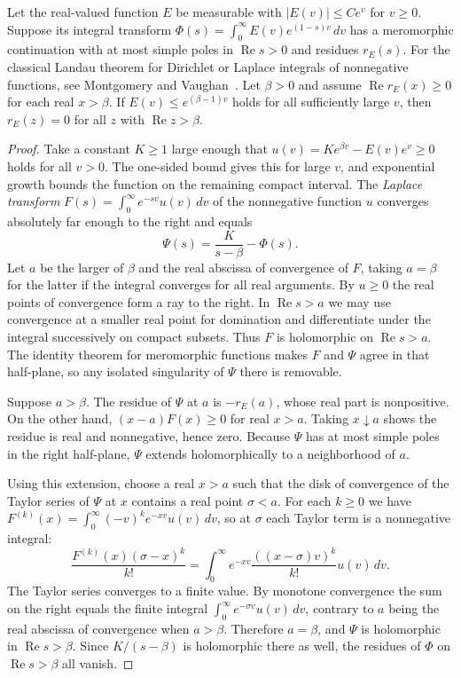 \begin{lemma}
\label{lem:landau}
\emitthmsource
Let the real-valued function $E$ be measurable with $|E(v)|\le C e^v$ for $v\ge0$. Suppose its integral transform $\Phi(s)=\int_0^\infty E(v)e^{(1-s)v}\,dv$ has a meromorphic continuation with at most simple poles in $\operatorname{Re}s>0$ and residues $r_E(s)$. For the classical Landau theorem for Dirichlet or Laplace integrals of nonnegative functions, see Montgomery and Vaughan~\cite{MontgomeryVaughan2007}. Let $\beta>0$ and assume $\operatorname{Re}r_E(x)\ge0$ for each real $x>\beta$. If $E(v)\le e^{(\beta-1)v}$ holds for all sufficiently large $v$, then $r_E(z)=0$ for all $z$ with $\operatorname{Re}z>\beta$.
\end{lemma}
\begin{proof}
Take a constant $K\ge1$ large enough that $u(v)=Ke^{\beta v}-E(v)e^v\ge0$ holds for all $v>0$. The one-sided bound gives this for large $v$, and exponential growth bounds the function on the remaining compact interval. The \emph{Laplace transform} $F(s)=\int_0^\infty e^{-sv}u(v)\,dv$ of the nonnegative function $u$ converges absolutely far enough to the right and equals
\[
 \Psi(s)=\frac K{s-\beta}-\Phi(s).
\]
Let $a$ be the larger of $\beta$ and the real abscissa of convergence of $F$, taking $a=\beta$ for the latter if the integral converges for all real arguments. By $u\ge0$ the real points of convergence form a ray to the right. In $\operatorname{Re}s>a$ we may use convergence at a smaller real point for domination and differentiate under the integral successively on compact subsets. Thus $F$ is holomorphic on $\operatorname{Re}s>a$. The identity theorem for meromorphic functions makes $F$ and $\Psi$ agree in that half-plane, so any isolated singularity of $\Psi$ there is removable.

Suppose $a>\beta$. The residue of $\Psi$ at $a$ is $-r_E(a)$, whose real part is nonpositive. On the other hand, $(x-a)F(x)\ge0$ for real $x>a$. Taking $x\downarrow a$ shows the residue is real and nonnegative, hence zero. Because $\Psi$ has at most simple poles in the right half-plane, $\Psi$ extends holomorphically to a neighborhood of $a$.

Using this extension, choose a real $x>a$ such that the disk of convergence of the Taylor series of $\Psi$ at $x$ contains a real point $\sigma<a$. For each $k\ge0$ we have $F^{(k)}(x)=\int_0^\infty(-v)^k e^{-xv}u(v)\,dv$, so at $\sigma$ each Taylor term is a nonnegative integral:
\[
 \frac{F^{(k)}(x)(\sigma-x)^k}{k!}
   =\int_0^\infty e^{-xv}\frac{((x-\sigma)v)^k}{k!}u(v)\,dv.
\]
The Taylor series converges to a finite value. By monotone convergence the sum on the right equals the finite integral $\int_0^\infty e^{-\sigma v}u(v)\,dv$, contrary to $a$ being the real abscissa of convergence when $a>\beta$. Therefore $a=\beta$, and $\Psi$ is holomorphic in $\operatorname{Re}s>\beta$. Since $K/(s-\beta)$ is holomorphic there as well, the residues of $\Phi$ on $\operatorname{Re}s>\beta$ all vanish.
\end{proof}


